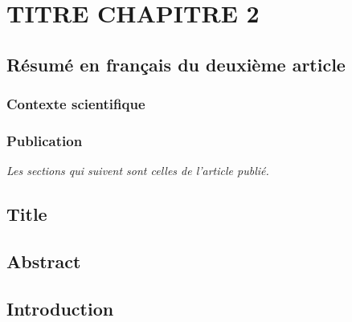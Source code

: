 \chapter{TITRE CHAPITRE 2}
\label{chap2}

\section{Résumé en français du deuxième article}

\subsection{Contexte scientifique}

\subsection{Publication}


\emph{Les sections qui suivent sont celles de l'article publié.}


\section{Title}\label{title}


\section{Abstract}\label{abstract}


\section{Introduction}\label{introduction}
